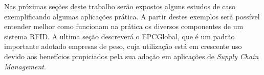 	Nas próximas seções deste trabalho serão expostos alguns estudos de caso exemplificando algumas aplicações prática. A partir destes exemplos será possível entender melhor como funcionam na prática os diversos componentes de um sistema RFID. A ultima seção descreverá o EPCGlobal, que é um padrão importante adotado empresas de peso, cuja utilização está em crescente uso devido aos benefícios propiciados pela sua adoção em aplicações de \textit{Supply Chain Management}.
%	 
%	 
	 


% 